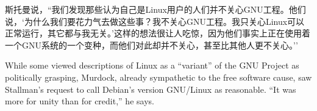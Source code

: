 \ifdefined\chs
斯托曼说，``我们发现那些认为自己是Linux用户的人们并不关心GNU工程。他们说，`为什么我们要花力气去做这些事？我不关心GNU工程。我只关心Linux可以正常运行，其它都与我无关。'这样的想法很让人吃惊，因为他们事实上正在使用着一个GNU系统的一个变种，而他们对此却并不关心，甚至比其他人更不关心。''
\fi








\ifdefined\eng
While some viewed descriptions of Linux as a ``variant'' of the GNU Project as politically grasping, Murdock, already sympathetic to the free software cause, saw Stallman's request to call Debian's version GNU/Linux as reasonable. ``It was more for unity than for credit,'' he says.
\fi

